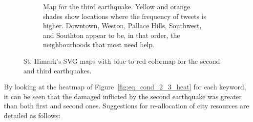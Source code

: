 \begin{figure}[!h]
\begin{subfigure}[!h]{0.46\textwidth}
        \caption{Map for the third earthquake. Yellow and orange shades show
        locations where the frequency of tweets is higher. Downtown, Weston,
        Pallace Hills, Southwest, and Southton appear to be, in that order, the 
        neighbourhoods that most need help.}
        \label{fig:eq_3_svg}
    \end{subfigure}
    \caption{St. Himark's SVG maps with blue-to-red colormap for the second and
    third earthquakes.}
    \label{fig:eq_2_3_svg}
\end{figure}

By looking at the heatmap of Figure~\ref{fig:eq_cond_2_3_heat} for each keyword,
it can be seen that the damaged inflicted by the second earthquake was greater
than both first and second ones. Suggestions for re-allocation of city resources
are detailed as follows: 


